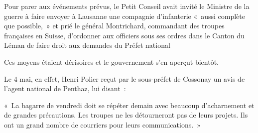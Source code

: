 \documentclass[french,twoside]{book} %
\newenvironment{quoteblock}%
  {\begin{quoting}}
  {\end{quoting}}
\newenvironment{quotebar}{%
    \def\FrameCommand{{\color{rubric!10!}\vrule width 0.5em} \hspace{0.9em}}%
    \def\OuterFrameSep{\itemsep} %
    \MakeFramed {\advance\hsize-\width \FrameRestore}
  }%
  {%
    \endMakeFramed
  }
\renewenvironment{quoteblock}%
  {%
    \savenotes
    \setstretch{0.9}
    \normalfont
    \begin{quotebar}
  }
  {%
    \end{quotebar}
    \spewnotes
  }
\begin{document}
\noindent Pour parer aux événements prévus, le Petit Conseil avait invité le Ministre de la guerre à faire envoyer à Lausanne une compagnie d’infanterie « aussi complète que possible, » et prié le général Montrichard, commandant des troupes françaises en Suisse, d’ordonner aux officiers sous ses ordres dans le Canton du Léman de faire droit aux demandes du Préfet national\par
Ces moyens étaient dérisoires et le gouvernement s’en aperçut bientôt.\par
Le 4 mai, en effet, Henri Polier reçut par le sous-préfet de Cossonay un avis de l’agent national de Penthaz, lui disant :\par

\begin{quoteblock}
 \noindent « La bagarre de vendredi doit se répéter demain avec beaucoup d’acharnement et de grandes précautions. Les troupes ne les détourneront pas de leurs projets. Ils ont un grand nombre de courriers pour leurs communications. »
 \end{quoteblock}
\end{document}

